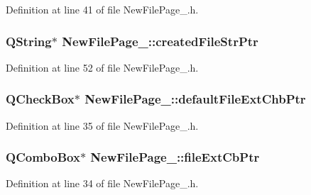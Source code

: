 Definition at line 41 of file New\-File\-Page\-\_.\-h.

\hypertarget{class_new_file_page__4_a40a59859a2576f2fdbddc4218f96d472}{
\subsubsection[{created\-File\-Str\-Ptr}]{\setlength{\rightskip}{0pt plus 5cm}Q\-String$\ast$ New\-File\-Page\-\_\-::created\-File\-Str\-Ptr\hspace{0.3cm}{\ttfamily [private]}}}\label{class_new_file_page__4_a40a59859a2576f2fdbddc4218f96d472}


Definition at line 52 of file New\-File\-Page\-\_.\-h.

\hypertarget{class_new_file_page__4_a3d192a050512836a080dab3b1cdf3387}{
\subsubsection[{default\-File\-Ext\-Chb\-Ptr}]{\setlength{\rightskip}{0pt plus 5cm}Q\-Check\-Box$\ast$ New\-File\-Page\-\_\-::default\-File\-Ext\-Chb\-Ptr\hspace{0.3cm}{\ttfamily [private]}}}\label{class_new_file_page__4_a3d192a050512836a080dab3b1cdf3387}


Definition at line 35 of file New\-File\-Page\-\_.\-h.

\hypertarget{class_new_file_page__4_afd3b7539e238b941bb03f981f087ed46}{
\subsubsection[{file\-Ext\-Cb\-Ptr}]{\setlength{\rightskip}{0pt plus 5cm}Q\-Combo\-Box$\ast$ New\-File\-Page\-\_\-::file\-Ext\-Cb\-Ptr\hspace{0.3cm}{\ttfamily [private]}}}\label{class_new_file_page__4_afd3b7539e238b941bb03f981f087ed46}


Definition at line 34 of file New\-File\-Page\-\_.\-h.

